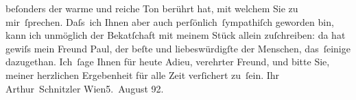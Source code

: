                beſonders {\pb}der warme und reiche Ton berührt hat, mit welchem
               Sie zu mir ſprechen. Daſs ich Ihnen aber auch perſönlich ſympathiſch geworden bin,
               kann ich unmöglich der Beka{\geminationn}tſchaft mit meinem Stück allein zuſchreiben: da
               hat gewiſs mein Freund Paul, der beſte und
               liebeswürdigſte der Menschen, das ſeinige dazugethan. Ich ſage Ihnen für heute Adieu,
                  {\pb}verehrter Freund, und bitte Sie, meiner herzlichen
               Ergebenheit für alle Zeit verſichert zu ſein.\pend
           \pstart Ihr \spacefill\mbox{Arthur Schnitzler}\pend{}
\pstart
           Wien5. August 92.\pend
           \endnumbering{}  \newcommand{\dateiname}{L03901}\newcommand{\titel}{Arthur Schnitzler an Theodor Herzl, 5. 8. 1892}\newcommand{\editorInnen}{Herausgegeben von Jahnke, SelmaMüller, Martin Anton}
